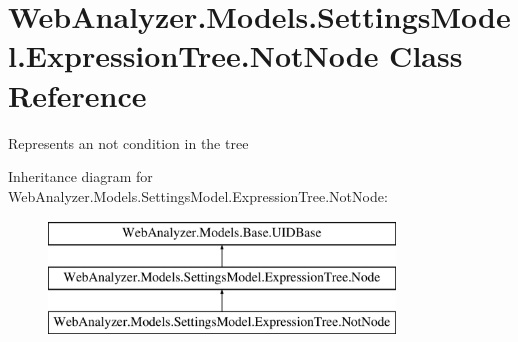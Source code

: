 \hypertarget{class_web_analyzer_1_1_models_1_1_settings_model_1_1_expression_tree_1_1_not_node}{}\section{Web\+Analyzer.\+Models.\+Settings\+Model.\+Expression\+Tree.\+Not\+Node Class Reference}
\label{class_web_analyzer_1_1_models_1_1_settings_model_1_1_expression_tree_1_1_not_node}


Represents an not condition in the tree  


Inheritance diagram for Web\+Analyzer.\+Models.\+Settings\+Model.\+Expression\+Tree.\+Not\+Node\+:\begin{figure}[H]
\begin{center}
\leavevmode
\includegraphics[height=3.000000cm]{class_web_analyzer_1_1_models_1_1_settings_model_1_1_expression_tree_1_1_not_node}
\end{center}
\end{figure}
